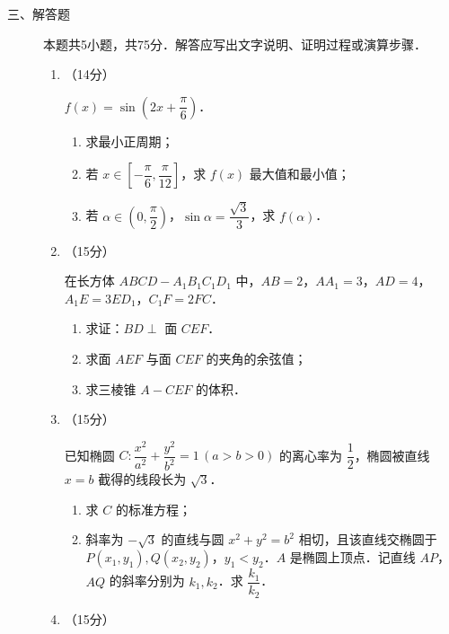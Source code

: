 \begin{description}
    \item[三、解答题] 本题共5小题，共75分．解答应写出文字说明、证明过程或演算步骤．
    \begin{enumerate}[leftmargin=5pt]
      \addtocounter{enumi}{+15}
        \item （14分）

        $f(x)=\sin\left(2x+\dfrac{\pi}{6}\right)$．

        \begin{enumerate}[label=(\arabic*)]
            \item 求最小正周期；
            \item 若 $x\in\left[-\dfrac{\pi}{6},\dfrac{\pi}{12}\right]$，求 $f(x)$ 最大值和最小值；
            \item 若 $\alpha\in\left(0,\dfrac{\pi}{2}\right)$，$\sin\alpha=\dfrac{\sqrt{3}}{3}$，求 $f(\alpha)$．
        \end{enumerate}

        \item （15分）

        在长方体 $ABCD-A_1B_1C_1D_1$ 中，$AB=2$，$AA_1=3$，$AD=4$，$A_1E=3ED_1$，$C_1F=2FC$．

        \begin{enumerate}[label=(\arabic*)]
            \item 求证：$BD\perp$ 面 $CEF$．
            \item 求面 $AEF$ 与面 $CEF$ 的夹角的余弦值；
            \item 求三棱锥 $A-CEF$ 的体积．
        \end{enumerate}

        \item （15分）

        已知椭圆 $C:\dfrac{x^2}{a^2}+\dfrac{y^2}{b^2}=1\,(a>b>0)$ 的离心率为 $\dfrac{1}{2}$，椭圆被直线 $x=b$ 截得的线段长为 $\sqrt{3}$．

        \begin{enumerate}[label=(\arabic*)]
            \item 求 $C$ 的标准方程；
            \item 斜率为 $-\sqrt{3}$ 的直线与圆 $x^2+y^2=b^2$ 相切，且该直线交椭圆于 $P(x_1,y_1),Q(x_2,y_2)$，$y_1<y_2$．$A$ 是椭圆上顶点．记直线 $AP$，$AQ$ 的斜率分别为 $k_1,k_2$．求 $\dfrac{k_1}{k_2}$．
        \end{enumerate}

        \item （15分）


\end{enumerate}
\end{description}
